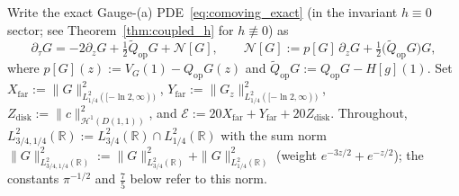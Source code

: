 \documentclass[11pt,a4paper]{article}
\begin{document}
Write the exact Gauge-(a) PDE~\eqref{eq:comoving_exact} (in the invariant $h\equiv 0$ sector; see Theorem~\ref{thm:coupled_h} for $h\not\equiv 0$) as
\[
\partial_\tau G = -2\partial_z G + \tfrac12\widetilde{Q}_{\mathrm{op}}G + \mathcal{N}[G], \qquad
\mathcal{N}[G] := p[G]\,\partial_z G + \tfrac12\bigl(\widetilde{Q}_{\mathrm{op}}G\bigr)G,
\]
where $p[G](z) := V_G(1) - Q_{\mathrm{op}}G(z)$ and $\widetilde{Q}_{\mathrm{op}}G := Q_{\mathrm{op}}G - H[g](1)$.
Set $X_{\mathrm{far}}:=\|G\|_{L^2_{1/4}([-\ln 2,\infty))}^2$, $Y_{\mathrm{far}}:=\|G_z\|_{L^2_{1/4}([-\ln 2,\infty))}^2$,
$Z_{\mathrm{disk}}:=\|c\|_{\mathcal{H}^1(D(1,1))}^2$, and $\mathcal{E}:=20 X_{\mathrm{far}}+Y_{\mathrm{far}}+20 Z_{\mathrm{disk}}$.
Throughout, $L^2_{3/4,1/4}(\mathbb{R}):=L^2_{3/4}(\mathbb{R})\cap L^2_{1/4}(\mathbb{R})$ with the sum norm
$\|G\|_{L^2_{3/4,1/4}(\mathbb{R})}^2:=\|G\|_{L^2_{3/4}(\mathbb{R})}^2+\|G\|_{L^2_{1/4}(\mathbb{R})}^2$
(weight $e^{-3z/2}+e^{-z/2}$); the constants $\pi^{-1/2}$ and $\tfrac75$ below refer to this norm.
\end{document}
